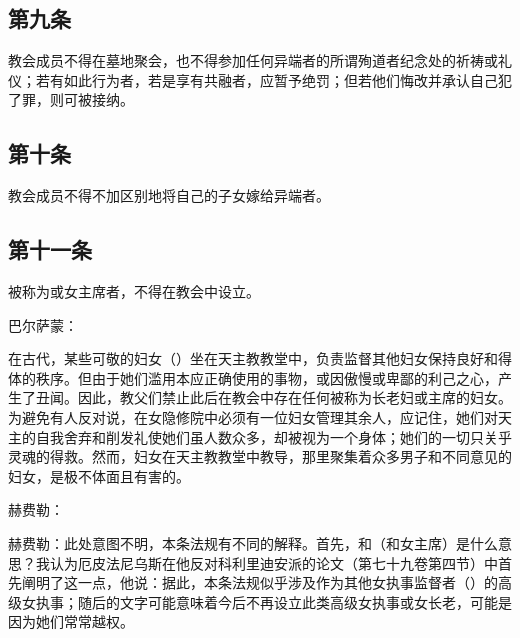 \subsection{第九条}

教会成员不得在墓地聚会，也不得参加任何异端者的所谓殉道者纪念处的祈祷或礼仪；若有如此行为者，若是享有共融者，应暂予绝罚；但若他们悔改并承认自己犯了罪，则可被接纳。\par

\par


\subsection{第十条}

教会成员不得不加区别地将自己的子女嫁给异端者。\par


\subsection{第十一条}

被称为或女主席者，不得在教会中设立。\par

巴尔萨蒙：\par

在古代，某些可敬的妇女（）坐在天主教教堂中，负责监督其他妇女保持良好和得体的秩序。但由于她们滥用本应正确使用的事物，或因傲慢或卑鄙的利己之心，产生了丑闻。因此，教父们禁止此后在教会中存在任何被称为长老妇或主席的妇女。为避免有人反对说，在女隐修院中必须有一位妇女管理其余人，应记住，她们对天主的自我舍弃和削发礼使她们虽人数众多，却被视为一个身体；她们的一切只关乎灵魂的得救。然而，妇女在天主教教堂中教导，那里聚集着众多男子和不同意见的妇女，是极不体面且有害的。\par

赫费勒：\par

赫费勒：此处意图不明，本条法规有不同的解释。首先，和（和女主席）是什么意思？我认为厄皮法尼乌斯在他反对科利里迪安派的论文（第七十九卷第四节）中首先阐明了这一点，他说：据此，本条法规似乎涉及作为其他女执事监督者（）的高级女执事；随后的文字可能意味着今后不再设立此类高级女执事或女长老，可能是因为她们常常越权。\par


